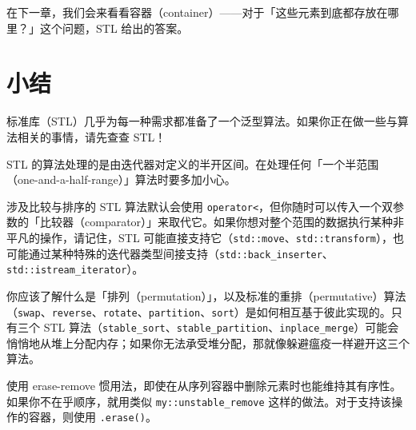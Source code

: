 在下一章，我们会来看看容器（container）——对于「这些元素到底都存放在哪里？」这个问题，STL 给出的答案。

\section{小结}

标准库（STL）几乎为每一种需求都准备了一个泛型算法。如果你正在做一些与算法相关的事情，请先查查 STL！

STL 的算法处理的是由迭代器对定义的半开区间。在处理任何「一个半范围（one-and-a-half-range）」算法时要多加小心。

涉及比较与排序的 STL 算法默认会使用 \texttt{operator<}，但你随时可以传入一个双参数的「比较器（comparator）」来取代它。如果你想对整个范围的数据执行某种非平凡的操作，请记住，STL 可能直接支持它（\texttt{std::\allowbreak{}move}、\texttt{std::\allowbreak{}transform}），也可能通过某种特殊的迭代器类型间接支持（\texttt{std::\allowbreak{}back\_\allowbreak{}inserter}、\texttt{std::\allowbreak{}istream\_\allowbreak{}iterator}）。

你应该了解什么是「排列（permutation）」，以及标准的重排（permutative）算法（\texttt{swap}、\texttt{reverse}、\texttt{rotate}、\texttt{partition}、\texttt{sort}）是如何相互基于彼此实现的。只有三个 STL 算法（\texttt{stable\_\allowbreak{}sort}、\texttt{stable\_\allowbreak{}partition}、\texttt{inplace\_\allowbreak{}merge}）可能会悄悄地从堆上分配内存；如果你无法承受堆分配，那就像躲避瘟疫一样避开这三个算法。

使用 erase-remove 惯用法，即使在从序列容器中删除元素时也能维持其有序性。如果你不在乎顺序，就用类似 \texttt{my::\allowbreak{}unstable\_\allowbreak{}remove} 这样的做法。对于支持该操作的容器，则使用 \texttt{.erase(\allowbreak{})\allowbreak{}}。
